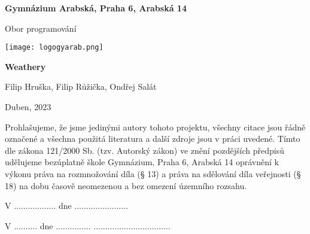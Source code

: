 \begin{titlepage}
\begin{center}
\large \vspace*{\fill}
\thispagestyle{empty}

\LARGE

{ \huge \textbf{Gymnázium Arabská, Praha 6, Arabská 14}}

{\LARGE Obor programování }

\vfill
\texttt{[image: logogyarab.png]}
\vspace{15pt}

\vfill

{\huge \textbf{Weathery}}

\vfill

Filip Hruška, Filip Růžička, Ondřej Salát

\vfill

{\large Duben, 2023}

\vspace*{\fill}
\end{center}
\end{titlepage}

\thispagestyle{empty}
\addtocounter{page}{-1}
\vspace*{\fill}
Prohlašujeme, že jsme jedinými autory tohoto projektu, všechny citace jsou řádně označené a všechna 
použitá literatura a další zdroje jsou v práci uvedené. Tímto dle zákona 121/2000 Sb. (tzv. Autorský zákon) 
ve znění pozdějších předpisů udělujeme bezúplatně škole Gymnázium, Praha 6, Arabská 14 oprávnění k výkonu 
práva na rozmnožování díla (§ 13) a práva na sdělování díla veřejnosti (§ 18) na dobu časově neomezenou a 
bez omezení územního rozsahu.

\vspace{2cm}
V .................. dne .......................


\vspace{2cm}


\vspace{2cm}


\vspace{2cm}
V .......... dne ............... \hspace{4cm} .................................
\vspace{2cm}

\newpage


\tableofcontents
